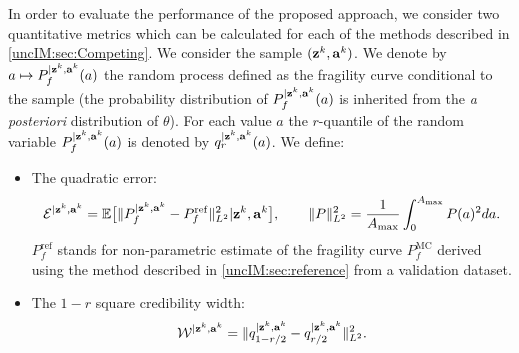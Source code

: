         In order to evaluate the performance of the proposed approach, we consider two quantitative metrics which can be calculated for each of the methods described in \cref{uncIM:sec:Competing}.
    We consider the sample $(\mathbf{z}^k,\mathbf{a}^k) $. We denote by $a \mapsto P_f^{|\mathbf{z}^k,\mathbf{a}^k}(a)$\vspace*{-4pt} the random process defined as the fragility curve conditional to the sample (the probability distribution of $P_f^{|\mathbf{z}^k,\mathbf{a}^k}(a)$\vspace*{-4pt} is inherited from the \emph{a posteriori} distribution of $\theta$). For each value $a$ the $r$-quantile of the random variable $P_f^{|\mathbf{z}^k,\mathbf{a}^k}(a)$ is denoted by $q_r^{|\mathbf{z}^k,\mathbf{a}^k}(a)$.  
    We define:
    \begin{itemize}
            \item The quadratic error: %
                \begin{equation} \label{uncIM:eq:quaderror}
                    \mathcal{E}^{|\mathbf{z}^k,\mathbf{a}^k} = \mathbb{E}\big[\| P_{f}^{|\mathbf{z}^k,\mathbf{a}^k} - P_f^{\mathrm{ref}} \|_{L^2}^2|\mathbf{z}^k,\mathbf{a}^k \big] ,\qquad \| P\|_{L^2}^2 = \frac{1}{A_{\rm max}} \int_{0}^{A_{\rm max}} P(a)^2 da .
                \end{equation}
    $P_f^{\mathrm{ref}}$ stands for non-parametric estimate of the fragility curve $P^{\text{MC}}_f$ derived using the method described in \cref{uncIM:sec:reference} from a validation dataset.  %
            \item  The $1-r$ square credibility width: %
                \begin{equation} \label{uncIM:eq:scaleerror}
                    \mathcal{W}^{|\mathbf{z}^k,\mathbf{a}^k} = \|q_{1-{r/2}}^{|\mathbf{z}^k,\mathbf{a}^k} - q_{{r/2}}^{|\mathbf{z}^k,\mathbf{a}^k}\|_{L^2}^2  .
                \end{equation}
        \end{itemize}

